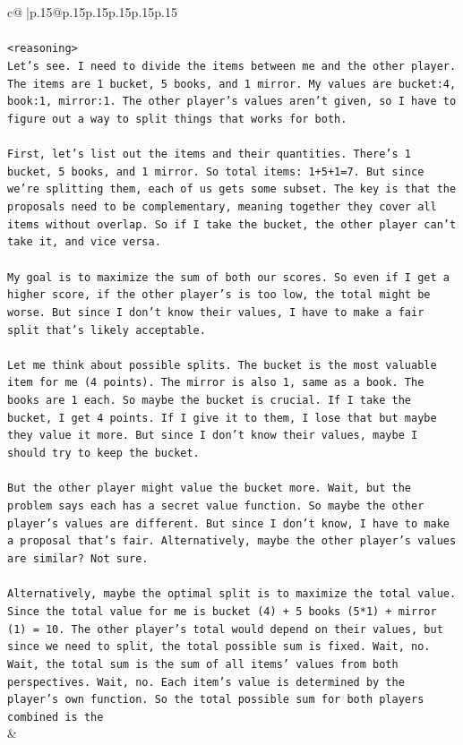 \documentclass{article}
\begin{document}
{\begin{supertabular}{c@{$\;$}|p{.15\linewidth}@{}p{.15\linewidth}p{.15\linewidth}p{.15\linewidth}p{.15\linewidth}p{.15\linewidth}}
{{{\\ 
\\ 
\texttt{<reasoning>} \\
\texttt{Let's see. I need to divide the items between me and the other player. The items are 1 bucket, 5 books, and 1 mirror. My values are bucket:4, book:1, mirror:1. The other player's values aren't given, so I have to figure out a way to split things that works for both.} \\
\\ 
\texttt{First, let's list out the items and their quantities. There's 1 bucket, 5 books, and 1 mirror. So total items: 1+5+1=7. But since we're splitting them, each of us gets some subset. The key is that the proposals need to be complementary, meaning together they cover all items without overlap. So if I take the bucket, the other player can't take it, and vice versa.} \\
\\ 
\texttt{My goal is to maximize the sum of both our scores. So even if I get a higher score, if the other player's is too low, the total might be worse. But since I don't know their values, I have to make a fair split that's likely acceptable.} \\
\\ 
\texttt{Let me think about possible splits. The bucket is the most valuable item for me (4 points). The mirror is also 1, same as a book. The books are 1 each. So maybe the bucket is crucial. If I take the bucket, I get 4 points. If I give it to them, I lose that but maybe they value it more. But since I don't know their values, maybe I should try to keep the bucket.} \\
\\ 
\texttt{But the other player might value the bucket more. Wait, but the problem says each has a secret value function. So maybe the other player's values are different. But since I don't know, I have to make a proposal that's fair. Alternatively, maybe the other player's values are similar? Not sure.} \\
\\ 
\texttt{Alternatively, maybe the optimal split is to maximize the total value. Since the total value for me is bucket (4) + 5 books (5*1) + mirror (1) = 10. The other player's total would depend on their values, but since we need to split, the total possible sum is fixed. Wait, no. Wait, the total sum is the sum of all items' values from both perspectives. Wait, no. Each item's value is determined by the player's own function. So the total possible sum for both players combined is the} \\
            }
        }
    }
    & \\ \\


\end{supertabular}}
\end{document}
